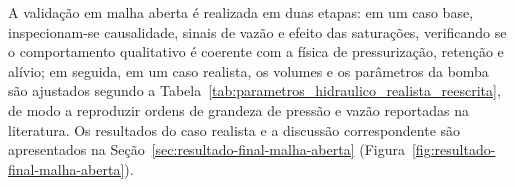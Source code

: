 \begin{table}[htbp]
\end{table}

A validação em malha aberta é realizada em duas etapas: em um caso base, inspecionam-se causalidade, sinais de vazão e efeito das saturações, verificando se o comportamento qualitativo é coerente com a física de pressurização, retenção e alívio; em seguida, em um caso realista, os volumes e os parâmetros da bomba são ajustados segundo a Tabela~\ref{tab:parametros_hidraulico_realista_reescrita}, de modo a reproduzir ordens de grandeza de pressão e vazão reportadas na literatura. Os resultados do caso realista e a discussão correspondente são apresentados na Seção~\ref{sec:resultado-final-malha-aberta} (Figura~\ref{fig:resultado-final-malha-aberta}).



